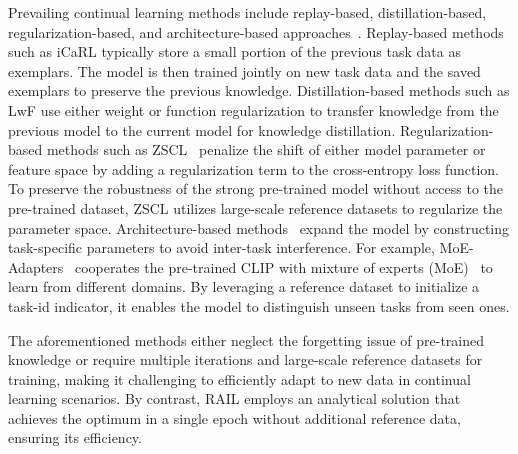 \documentclass{article}
\begin{document}
Prevailing continual learning methods include replay-based, distillation-based, regularization-based, and architecture-based approaches~\cite{wang2024comprehensive}. Replay-based methods such as iCaRL \cite{rebuffi2017icarl} typically store a small portion of the previous task data as exemplars. The model is then trained jointly on new task data and the saved exemplars to preserve the previous knowledge. Distillation-based methods such as LwF \cite{li2017learning} use either weight or function regularization to transfer knowledge from the previous model to the current model for knowledge distillation. Regularization-based methods such as ZSCL~\cite{Zheng_2023_ICCV} penalize the shift of either model parameter or feature space by adding a regularization term to the cross-entropy loss function. To preserve the robustness of the strong pre-trained model without access to the pre-trained dataset, ZSCL utilizes large-scale reference datasets to regularize the parameter space. 
Architecture-based methods~\cite{mallya2018piggyback, wang2022s, wang2024hierarchical} expand the model by constructing task-specific parameters to avoid inter-task interference. For example, MoE-Adapters~\cite{yu2024boosting} cooperates the pre-trained CLIP with mixture of experts (MoE)~\cite{jacobs1991adaptive} to learn from different domains. By leveraging a reference dataset to initialize a task-id indicator, it enables the model to distinguish unseen tasks from seen ones.

The aforementioned methods either neglect the forgetting issue of pre-trained knowledge or require multiple iterations and large-scale reference datasets for training, making it challenging to efficiently adapt to new data in continual learning scenarios. By contrast, RAIL employs an analytical solution that achieves the optimum in a single epoch without additional reference data, ensuring its efficiency.

\end{document}
